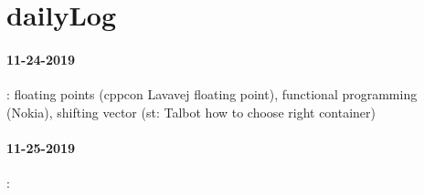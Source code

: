 \section{dailyLog}
\paragraph{11-24-2019}: floating points (cppcon Lavavej floating point), functional programming (Nokia), shifting vector (st: Talbot how to choose right container)
\paragraph{11-25-2019}:



